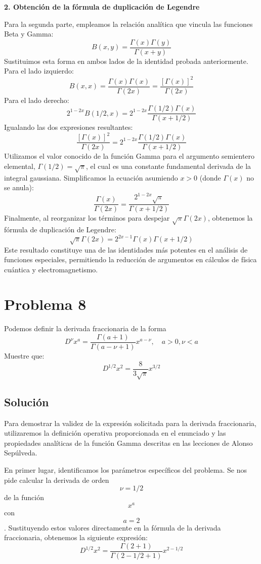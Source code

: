 \documentclass[a4paper]{article}
\begin{document}
\textbf{2. Obtención de la fórmula de duplicación de Legendre}

Para la segunda parte, empleamos la relación analítica que vincula las funciones Beta y Gamma:
$$ B(x, y) = \frac{\Gamma(x)\Gamma(y)}{\Gamma(x+y)} $$
Sustituimos esta forma en ambos lados de la identidad probada anteriormente. Para el lado izquierdo:
$$ B(x, x) = \frac{\Gamma(x)\Gamma(x)}{\Gamma(2x)} = \frac{[\Gamma(x)]^2}{\Gamma(2x)} $$
Para el lado derecho:
$$ 2^{1-2x} B(1/2, x) = 2^{1-2x} \frac{\Gamma(1/2)\Gamma(x)}{\Gamma(x + 1/2)} $$
Igualando las dos expresiones resultantes:
$$ \frac{[\Gamma(x)]^2}{\Gamma(2x)} = 2^{1-2x} \frac{\Gamma(1/2)\Gamma(x)}{\Gamma(x + 1/2)} $$
Utilizamos el valor conocido de la función Gamma para el argumento semientero elemental, $\Gamma(1/2) = \sqrt{\pi}$, el cual es una constante fundamental derivada de la integral gaussiana. Simplificamos la ecuación asumiendo $x > 0$ (donde $\Gamma(x)$ no se anula):
$$ \frac{\Gamma(x)}{\Gamma(2x)} = \frac{2^{1-2x} \sqrt{\pi}}{\Gamma(x + 1/2)} $$
Finalmente, al reorganizar los términos para despejar $\sqrt{\pi}\Gamma(2x)$, obtenemos la fórmula de duplicación de Legendre:
$$ \sqrt{\pi} \Gamma(2x) = 2^{2x-1} \Gamma(x) \Gamma(x + 1/2) $$
Este resultado constituye una de las identidades más potentes en el análisis de funciones especiales, permitiendo la reducción de argumentos en cálculos de física cuántica y electromagnetismo.


\section{Problema 8}
Podemos definir la derivada fraccionaria de la forma
$$D^{\nu}x^{a} = \frac{\Gamma(a+1)}{\Gamma(a-\nu+1)} x^{a-\nu}, \quad a > 0, \nu < a$$
Muestre que:
$$D^{1/2}x^2 = \frac{8}{3\sqrt{\pi}} x^{3/2}$$

\subsection{Solución}

Para demostrar la validez de la expresión solicitada para la derivada fraccionaria, utilizaremos la definición operativa proporcionada en el enunciado y las propiedades analíticas de la función Gamma descritas en las lecciones de Alonso Sepúlveda.

En primer lugar, identificamos los parámetros específicos del problema. Se nos pide calcular la derivada de orden $$\nu = 1/2$$ de la función $$x^a$$ con $$a = 2$$. Sustituyendo estos valores directamente en la fórmula de la derivada fraccionaria, obtenemos la siguiente expresión:
$$D^{1/2}x^2 = \frac{\Gamma(2+1)}{\Gamma(2-1/2+1)} x^{2-1/2}$$
\end{document}
